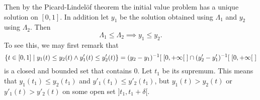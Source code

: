 Then by the Picard-Lindelöf theorem the initial value problem has a unique solution on $[0,1]$. In addition let $y_1$ be the solution obtained using $\Lambda_1$ and $y_2$ using $\Lambda_2$. Then
\[ \Lambda_1 \leq \Lambda_2 \implies y_1 \leq y_2. \]
To see this, we may first remark that
\[ \setbuilder{t\in[0,1]}{y_1(t)\leq y_2(t) \land y'_1(t)\leq y'_2(t)} = (y_2-y_1)^{-1}[\;[0,+\infty[\;] \cap (y'_2-y'_1)^{-1}[\;[0,+\infty[\;] \]
is a closed and bounded set that contains $0$. Let $t_1$ be its supremum. This means that $y_1(t_1)\leq y_2(t_1)$ and $y'_1(t_1)\leq y'_2(t_1)$, but $y_1(t) > y_2(t)$ or $y'_1(t) > y'_2(t)$ on some open set $]t_1, t_1+\delta [$.







